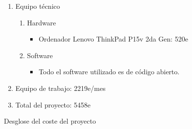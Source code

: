 \begin{figure}[H]
\begin{enumerate}
    \item Equipo técnico
    \begin{enumerate}
    \item Hardware
    \begin{itemize}
        \item Ordenador Lenovo ThinkPad P15v 2da Gen: 520e
    \end{itemize}
    \item Software
    \begin{itemize}
        \item Todo el software utilizado es de código abierto.
    \end{itemize}
    \end{enumerate}
    \item Equipo de trabajo: 2219e/mes
    \item Total del proyecto: 5458e
\end{enumerate}
\caption{Desglose del coste del proyecto}
\label{fig:desglose}
\end{figure}
